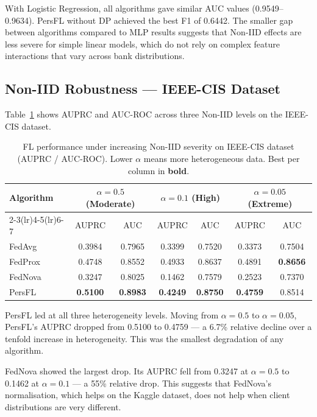 \documentclass[12pt, a4paper]{article}
\begin{document}
With Logistic Regression, all algorithms gave similar AUC values (0.9549--0.9634). PersFL without DP achieved the best F1 of 0.6442. The smaller gap between algorithms compared to MLP results suggests that Non-IID effects are less severe for simple linear models, which do not rely on complex feature interactions that vary across bank distributions.

\subsection{Non-IID Robustness --- IEEE-CIS Dataset}
\label{sec:results_non_iid}

Table~\ref{tab:non_iid_results} shows AUPRC and AUC-ROC across three Non-IID levels on the IEEE-CIS dataset.

\begin{table}[H]
\centering
\caption{FL performance under increasing Non-IID severity on IEEE-CIS dataset (AUPRC / AUC-ROC).
Lower $\alpha$ means more heterogeneous data. Best per column in \textbf{bold}.}
\label{tab:non_iid_results}
\begin{tabular}{lcccccc}
\toprule
\multirow{2}{*}{\textbf{Algorithm}}
  & \multicolumn{2}{c}{$\alpha = 0.5$ (Moderate)}
  & \multicolumn{2}{c}{$\alpha = 0.1$ (High)}
  & \multicolumn{2}{c}{$\alpha = 0.05$ (Extreme)} \\
\cmidrule(lr){2-3}\cmidrule(lr){4-5}\cmidrule(lr){6-7}
  & AUPRC & AUC & AUPRC & AUC & AUPRC & AUC \\
\midrule
FedAvg  & 0.3984 & 0.7965 & 0.3399 & 0.7520 & 0.3373 & 0.7504 \\
FedProx & 0.4748 & 0.8552 & 0.4933 & 0.8637 & 0.4891 & \textbf{0.8656} \\
FedNova & 0.3247 & 0.8025 & 0.1462 & 0.7579 & 0.2523 & 0.7370 \\
PersFL  & \textbf{0.5100} & \textbf{0.8983}
         & \textbf{0.4249} & \textbf{0.8750}
         & \textbf{0.4759} & 0.8514 \\
\bottomrule
\end{tabular}
\end{table}

PersFL led at all three heterogeneity levels. Moving from $\alpha = 0.5$ to $\alpha = 0.05$, PersFL's AUPRC dropped from 0.5100 to 0.4759 --- a 6.7\% relative decline over a tenfold increase in heterogeneity. This was the smallest degradation of any algorithm.

FedNova showed the largest drop. Its AUPRC fell from 0.3247 at $\alpha = 0.5$ to 0.1462 at $\alpha = 0.1$ --- a 55\% relative drop. This suggests that FedNova's normalisation, which helps on the Kaggle dataset, does not help when client distributions are very different.
\end{document}
